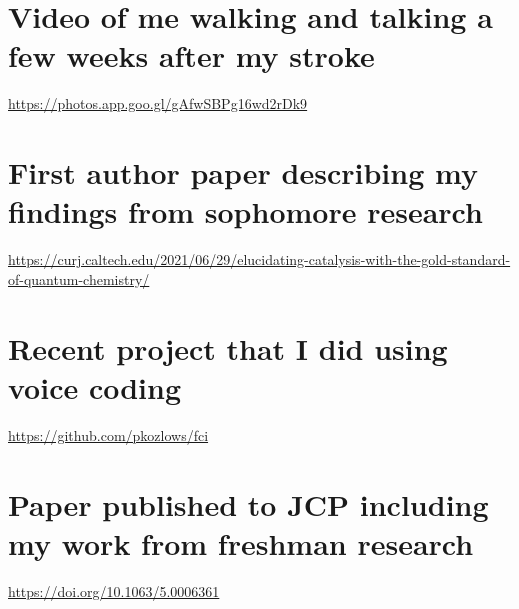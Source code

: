 \documentclass{article}
\begin{document}
\section{Video of me walking and talking a few weeks after my stroke}
\url{https://photos.app.goo.gl/gAfwSBPg16wd2rDk9}
\section{First author paper describing my findings from sophomore research}
\url{https://curj.caltech.edu/2021/06/29/elucidating-catalysis-with-the-gold-standard-of-quantum-chemistry/}
\section{Recent project that I did using voice coding}
\url{https://github.com/pkozlows/fci}
\section{Paper published to JCP including my work from freshman research}
\url{https://doi.org/10.1063/5.0006361}
\end{document}
